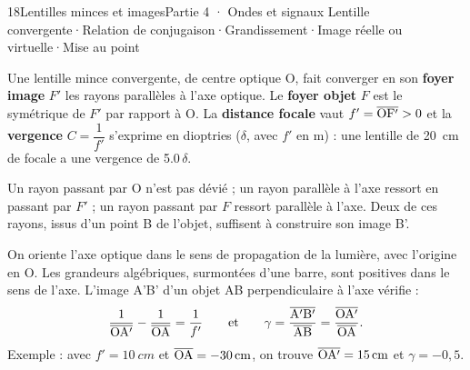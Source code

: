 \begin{ouverture}[lunette]{18}{Lentilles minces et images}{Partie 4 · Ondes et signaux}
{Lentille convergente\enspace·\enspace Relation de conjugaison\enspace·\enspace Grandissement\enspace·\enspace Image réelle ou virtuelle\enspace·\enspace Mise au point}
\end{ouverture}
\essentiel
{}
\begin{definition}
Une lentille mince convergente, de centre optique O, fait converger en son \textbf{foyer image} $F'$ les rayons parallèles à l'axe optique.
Le \textbf{foyer objet} $F$ est le symétrique de $F'$ par rapport à O. La \textbf{distance focale} vaut $f'=\overline{\mathrm{OF'}}>0$ et la \textbf{vergence} $C=\dfrac{1}{f'}$ s'exprime
en dioptries ($\delta$, avec $f'$ en m) : une lentille de \qty{20}{cm} de focale a une vergence de \num{5,0}\,$\delta$.
\end{definition}
\begin{propriete}
Un rayon passant par O n'est pas dévié ; un rayon parallèle à l'axe ressort en passant par $F'$ ; un rayon passant par $F$ ressort
parallèle à l'axe. Deux de ces rayons, issus d'un point B de l'objet, suffisent à construire son image B'.
\end{propriete}
\begin{loi}
On oriente l'axe optique dans le sens de propagation de la lumière, avec l'origine en O. Les grandeurs algébriques, surmontées
d'une barre, sont positives dans le sens de l'axe. L'image A'B' d'un objet AB perpendiculaire à l'axe vérifie :
\[\frac{1}{\overline{\mathrm{OA'}}}-\frac{1}{\overline{\mathrm{OA}}}=\frac{1}{f'}\qquad\text{et}\qquad\gamma=\frac{\overline{\mathrm{A'B'}}}{\overline{\mathrm{AB}}}=\frac{\overline{\mathrm{OA'}}}{\overline{\mathrm{OA}}}.\]
Exemple : avec $f'=\qty{10}{cm}$ et $\overline{\mathrm{OA}}=\qty{-30}{cm}$, on trouve $\overline{\mathrm{OA'}}=\qty{15}{cm}$ et $\gamma=-0{,}5$.
\end{loi}
